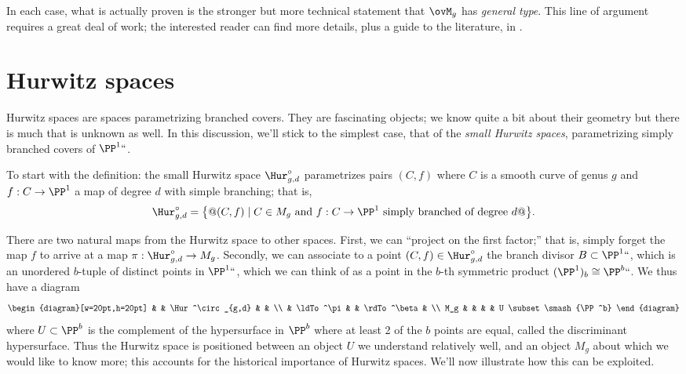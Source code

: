 In each case, what is actually proven is the stronger but more
technical statement that $\ovM_g$ has \emph{general type}.
%
This line of argument requires a great deal of work; the interested reader
can find more details, plus a guide to the literature, in
\cite{MR1631825}.

\section{Hurwitz spaces}\label{Hurwitz spaces}

Hurwitz spaces are spaces parametrizing branched covers. They are fascinating objects; we know quite a bit about their geometry but there is much that is unknown as well. In this discussion, we'll stick to the simplest case, that of the \emph{small Hurwitz spaces}, parametrizing simply branched covers of $\PP^1` `$.
%
%

To start with the definition: the small Hurwitz space $\Hur^\circ_{g,d}$
%
parametrizes pairs $(C, f)$ where $C$ is a smooth
curve of genus $g$ and $f : C \to \PP^1$ a map of degree $d$ with
simple branching; that is,
$$
\Hur^\circ_{g,d} = \bigl\{@(C, f) \mid C \in M_g
\text{ and } f:C \to \PP^1 \text{ simply branched of degree } d@\bigr\}.
$$

There are two natural maps from the Hurwitz space to other spaces.
First, we can ``project on the first factor;'' that is, simply forget
the map $f$ to arrive at a map $\pi : \Hur^\circ_{g,d} \to M_g$.
Secondly, we can associate to a point $(C,f) \in \Hur^\circ_{g,d}$ the
branch divisor $B \subset \PP^1` `$, which is an unordered $b$-tuple
of distinct points in $\PP^1` `$, which we can think of as a point in
the $b$-th symmetric product $(\PP^1)_b  \cong \PP^b` `$. We thus have
a diagram
$$
\begin{diagram}[w=20pt,h=20pt]
& & \Hur^\circ_{g,d} & & \\
& \ldTo^\pi & & \rdTo^\beta & \\
M_g & & & & U \subset \smash{\PP^b}
\end{diagram}
\index{beta@$\beta$ (Hurwicz spaces)}%
$$
where $U \subset \PP^b$ is the complement of the hypersurface in $\PP^{b}$ where at least 2 of the
$b$ points are equal, called the
discriminant hypersurface.
%
Thus the Hurwitz space is positioned between an object $U$ we
understand relatively well, and an object $M_g$ about which we would
like to know more; this accounts for the historical importance of
Hurwitz spaces. We'll now illustrate how this can be exploited.

